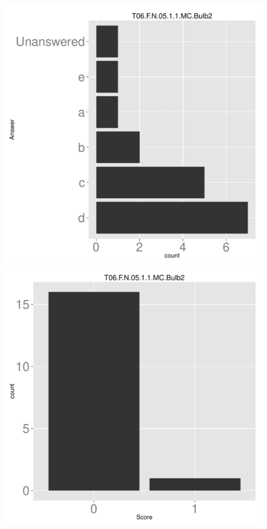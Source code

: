 \documentclass[12pt,nohyper]{tufte-handout}\usepackage[]{graphicx}\usepackage[]{color}
\begin{document}
\begin{center} \includegraphics[width=.45\linewidth]{Topic06_51_answer} \includegraphics[width=.45\linewidth]{Topic06_51_score} \end{center} 
\end{document}
